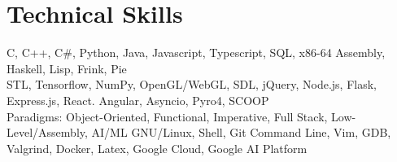 \documentclass[12pt]{article}
\begin{document}
	\section*{Technical Skills}
		 \normalsize{C, C++, C\#, Python, Java, Javascript, Typescript, SQL, x86-64 Assembly, Haskell, Lisp, Frink, Pie}\\
		  \normalsize{STL, Tensorflow, NumPy, OpenGL/WebGL, SDL, jQuery, Node.js, Flask, Express.js, React. Angular, Asyncio, Pyro4, SCOOP}\\
		\noindent \normalsize{Paradigms:} \normalsize{Object-Oriented, Functional, Imperative, Full Stack, Low-Level/Assembly, AI/ML}
		 \normalsize{GNU/Linux, Shell, Git Command Line, Vim, GDB, Valgrind, Docker, Latex, Google Cloud, Google AI Platform}\\
\end{document}

